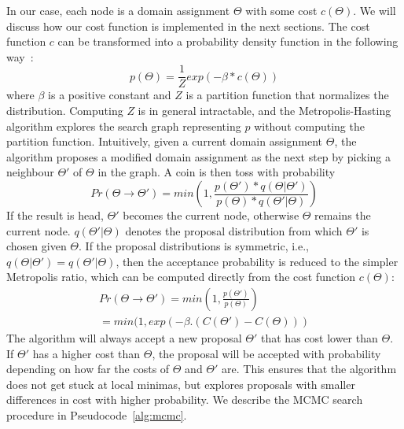 In our case, each node is a domain assignment $\Theta$
with some cost $c(\Theta)$. 
We will discuss how our cost function is implemented in the next sections.
The cost function $c$ can be transformed 
into a probability density function in the following way~\cite{mcmcbook}:
\begin{equation}
	p(\Theta) = \frac{1}{Z}exp(-\beta * c(\Theta))
\end{equation}
where $\beta$ is a positive constant and $Z$ is a partition function  that
normalizes the distribution. Computing $Z$ is in general 
intractable, and the Metropolis-Hasting algorithm 
explores the search graph representing $p$ without computing the partition function. 
Intuitively, given a current domain
assignment $\Theta$, the algorithm proposes a modified 
domain assignment as the next step  by picking a neighbour
$\Theta'$ of $\Theta$ in the graph. A coin is then toss with
probability 
\begin{equation}
Pr(\Theta \rightarrow \Theta') = min(1, \frac{p(\Theta')*q(\Theta| \Theta')}{p(\Theta)*q(\Theta'| \Theta)})
\end{equation}
If the result is head, $\Theta'$
becomes the current node, otherwise $\Theta$ remains the current node.
$q(\Theta'| \Theta)$ denotes the proposal distribution from 
which $\Theta'$ is chosen given $\Theta$. If the proposal 
distributions is symmetric, i.e., 
$q(\Theta| \Theta') = q(\Theta'| \Theta)$, then the acceptance
probability is reduced to the simpler Metropolis ratio, which
can be computed directly from the cost function $c(\Theta)$:
\begin{multline}
Pr(\Theta \rightarrow \Theta') = min(1, \frac{p(\Theta')}{p(\Theta)}) \\
= min(1, exp(-\beta.(C(\Theta') - C(\Theta)))
\end{multline}
The algorithm will always accept a new proposal $\Theta'$
that has cost lower than $\Theta$. If $\Theta'$ has a 
higher cost than $\Theta$, the proposal will be 
accepted with probability depending on 
how far the costs of $\Theta$ and $\Theta'$ are. This ensures that 
the algorithm does not get stuck at local minimas, but 
explores proposals with smaller differences in cost with 
higher probability. We describe the MCMC search procedure 
in Pseudocode~\cref{alg:mcmc}. 

